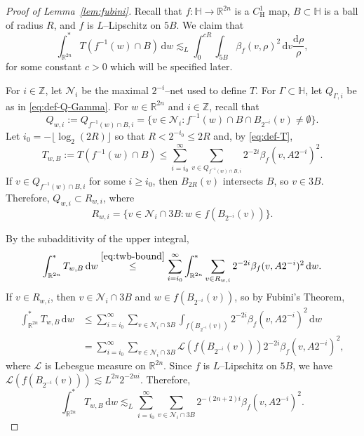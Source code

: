\documentclass[12pt,reqno]{amsart}
\newcommand{\cL}{\mathcal{L}}
\newcommand{\cN}{\mathcal{N}}
\newcommand{\HH}{\mathbb{H}}
\newcommand{\R}{\mathbb{R}}
\newcommand{\Z}{\mathbb{Z}}
\newcommand{\ud}[0]{\,\mathrm{d}}
\newcommand{\from}{\colon}
\theoremstyle{remark}
\newcommand{\0}{\mathbf{0}}
\renewcommand{\1}{\mathbf 1}
\begin{document}
\begin{proof}[Proof of Lemma~\ref{lem:fubini}]
  Recall that $f\from \HH \to \R^{2n}$ is a $C^1_{\mathrm{H}}$ map, $B\subset \HH$ is a ball of radius $R$, and $f$ is $L$--Lipschitz on $5B$. We claim that 
  $$
  \int^*_{\R^{2n}} T(f^{-1}(w)\cap B)\ud w \lesssim_L \int_0^{cR} \int_{5B}\beta_f(v, \rho)^2 \ud v \frac{\mathrm d\rho}{\rho},
  $$
  for some constant $c>0$ which will be specified later.

  For $i\in \Z$, let $\cN_i$ be the maximal $2^{-i}$--net used to define $T$. For $\Gamma\subset \HH$, let $Q_{\Gamma,i}$ be as in \eqref{eq:def-Q-Gamma}. For $w\in \R^{2n}$ and $i\in \Z$, recall that
  $$
  Q_{w,i}:=Q_{f^{-1}(w)\cap B,i} = \{v\in \cN_i : f^{-1}(w)\cap B \cap B_{2^{-i}}(v) \ne \emptyset\}.
  $$
  Let $i_0 = -\lfloor \log_2(2R)\rfloor$ so that $R < 2^{-i_0} \le 2R$ and, by \eqref{eq:def-T}, 
  \begin{equation}\label{eq:twb-bound}
    T_{w,B} := T(f^{-1}(w)\cap B) \le \sum_{i=i_0}^\infty \sum_{v\in Q_{f^{-1}(w)\cap B,i}} 2^{-2i} \beta_f(v, A 2^{-i})^2.
  \end{equation}
  If $v\in Q_{f^{-1}(w)\cap B,i}$ for some $i\ge i_0$, then $B_{2R}(v)$ intersects $B$, so $v \in 3B$. Therefore,
  $Q_{w,i}\subset R_{w,i}$, where
  $$R_{w,i} = \{v \in \cN_i \cap 3B : w\in f(B_{2^{-i}}(v))\}.$$

  By the subadditivity of the upper integral,
  $$\int^*_{\R^{2n}} T_{w,B} \ud w
  \stackrel{\eqref{eq:twb-bound}}{\le} \sum_{i=i_0}^\infty \int^*_{\R^{2n}} \sum_{v\in R_{w,i}} 2^{-2i} \beta_f(v, A 2^{-i})^2 \ud w.$$
  If $v\in R_{w,i}$, then $v\in \cN_i\cap 3B$ and $w\in f(B_{2^{-i}}(v))$, so by Fubini's Theorem,
  \begin{align*}
    \int^*_{\R^{2n}} T_{w,B} \ud w & \le \sum_{i=i_0}^\infty \sum_{v \in \cN_i \cap 3B} \int_{f(B_{2^{-i}}(v))} 2^{-2i} \beta_f(v, A 2^{-i})^2 \ud w \\
    & = \sum_{i=i_0}^\infty \sum_{v \in \cN_i \cap 3B} \cL\left(f(B_{2^{-i}}(v))\right) 2^{-2i} \beta_f(v, A 2^{-i})^2,
  \end{align*}
  where $\cL$ is Lebesgue measure on $\R^{2n}$.
  Since $f$ is $L$--Lipschitz on $5B$, we have $\cL(f(B_{2^{-i}}(v))) \lesssim L^{2n} 2^{-2n i}$. Therefore,
  \begin{equation}\label{eq:fubini-interm}
    \int^*_{\R^{2n}} T_{w,B} \ud w \lesssim_L \sum_{i=i_0}^\infty \sum_{v\in \cN_i\cap 3B} 2^{-(2n+2)i} \beta_f(v, A 2^{-i})^2.
  \end{equation}


\end{proof}
\end{document}
